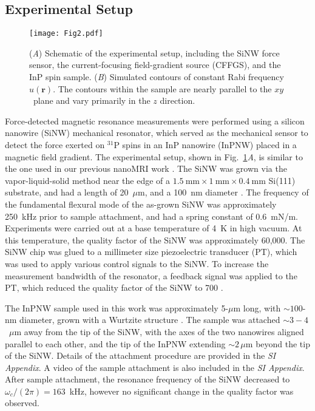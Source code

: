 \documentclass[9pt,twocolumn,twoside,lineno]{pnas-new}
\begin{document}
\subsection*{Experimental Setup}
\begin{figure}[h]
    \centering
    \texttt{[image: Fig2.pdf]}
    \caption{(\textit{A}) Schematic of the experimental setup, including the SiNW force sensor, the current-focusing field-gradient source (CFFGS), and the InP spin sample.
    (\textit{B}) Simulated contours of constant Rabi frequency $u(\mathbf{r})$. The contours within the sample are nearly parallel to the $xy$~plane and vary primarily in the $z$ direction.}
    \label{fig:Fig2}
\end{figure}
Force-detected magnetic resonance measurements were performed using a silicon nanowire (SiNW) mechanical resonator, which served as the mechanical sensor to detect the force exerted on $^{31}$P spins in an InP nanowire (InPNW) placed in a magnetic field gradient. The experimental setup, shown in Fig.~\ref{fig:Fig2}\textit{A}, is similar to the one used in our previous nanoMRI work \cite{Rose2018}.
The SiNW was grown via the vapor-liquid-solid method near the edge of a $1.5~\text{mm}\times1~\text{mm}\times0.4~\text{mm}$ Si(111) substrate, and had a length of 20~$\mu$m, and a 100~nm diameter \cite{Sahafi2020}.
The frequency of the fundamental flexural mode of the as-grown SiNW was approximately 250~kHz prior to sample attachment, and had a spring constant of 0.6~mN/m.
Experiments were carried out at a base temperature of 4~K in high vacuum.
At this temperature, the quality factor of the SiNW was approximately 60,000. The SiNW chip was glued to a millimeter size piezoelectric transducer (PT), which was used to apply various control signals to the SiNW. To increase the measurement bandwidth of the resonator, a feedback signal was applied to the PT, which reduced the quality factor of the SiNW to 700 \cite{Poggio2007}.

The InPNW sample used in this work was approximately 5-$\mu$m long, with $\sim 100$-nm diameter, grown with a Wurtzite structure \cite{Dalacu2012}.
The sample was attached $\sim3-4$~$\mu$m away from the tip of the SiNW, with the axes of the two nanowires aligned parallel to each other, and the tip of the InPNW extending $\sim 2\,\mu\text{m}$ beyond the tip of the SiNW.
Details of the attachment procedure are provided in the \textit{SI Appendix}.
A video of the sample attachment is also included in the \textit{SI Appendix}.
After sample attachment, the resonance frequency of the SiNW decreased to $\omega_c/(2\pi)=163$~kHz, however no significant change in the quality factor was observed.
\end{document}
